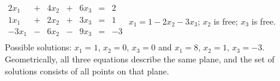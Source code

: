 {$\begin{array}{ccccccc}
2x_1&+&4x_2&+&6x_3&=&2\\
1x_1&+&2x_2&+&3x_3&=&1\\
-3x_1&-&6x_2&-&9x_3&=&-3\\
\end{array}$}
{$x_1=1-2x_2-3x_3$; $x_2$ is free; $x_3$ is free.
Possible solutions: $x_1=1$, $x_2=0$, $x_3=0$ and $x_1=8$, $x_2=1$, $x_3 = -3$. Geometrically, all three equations describe the same plane, and the set of solutions consists of all points on that plane.}